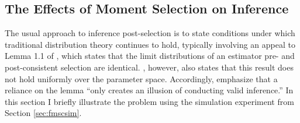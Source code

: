 \documentclass[12pt]{article}
\theoremstyle{definition}
\begin{document}

\subsection{The Effects of Moment Selection on Inference}
The usual approach to inference post-selection is to state conditions under which traditional distribution theory continues to hold, typically involving an appeal to Lemma 1.1 of \citet[p.\ 168]{Poetscher1991}, which states that the limit distributions of an estimator pre- and post-consistent selection are identical. \citet[pp.\ 179--180]{Poetscher1991}, however, also states that this result does not hold uniformly over the parameter space. 
Accordingly, \citet[p.\ 22]{LeebPoetscher2005} emphasize that a reliance on the lemma ``only creates an illusion of conducting valid inference.'' In this section I briefly illustrate the problem using the simulation experiment from Section \ref{sec:fmscsim}.
\end{document}
